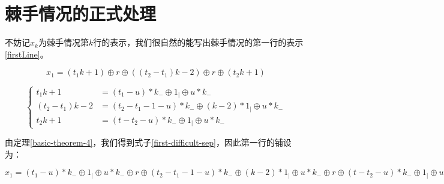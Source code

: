 \section{棘手情况的正式处理}

不妨记$x_k$为棘手情况第$k$行的表示，我们很自然的能写出棘手情况的第一行的表示\ref{firstLine}。

\begin{equation}
    x_1 = (t_1k + 1) \oplus r \oplus ((t_2 - t_1)k - 2) \oplus r \oplus  (t_2k + 1)
    \label{firstLine}
\end{equation}

$$
    \left\{
    \begin{aligned}
        t_1k + 1         & = (t_1 - u) * k_{-}  \oplus 1_{\vert} \oplus u * k_{-}                     \\
        (t_2 - t_1)k - 2 & = (t_2 - t_1 - 1 - u) * k_{-}  \oplus (k - 2) * 1_{\vert} \oplus u * k_{-} \\
        t_2k + 1         & = (t - t_2 - u) * k_{-}  \oplus 1_{\vert} \oplus u * k_{-}
        \label{first-difficult-sep}
    \end{aligned}
    \right.
$$


由定理\ref*{basic-theorem-4}，我们得到式子\ref*{first-difficult-sep}，因此第一行的铺设为：

$x_1 = (t_1 - u) * k_{-}  \oplus 1_{\vert} \oplus u * k_{-} \oplus r \oplus  (t_2 - t_1 - 1 - u) * k_{-}  \oplus
    (k - 2) * 1_{\vert} \oplus u * k_{-} \oplus r \oplus (t - t_2 - u) * k_{-}  \oplus 1_{\vert} \oplus u * k_{-}$

